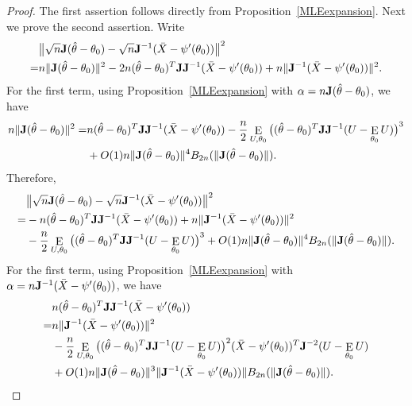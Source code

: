 \documentclass[11pt, letterpaper]{article}
\DeclareMathOperator{\myE}{E}
\theoremstyle{plain}
\theoremstyle{definition}
\theoremstyle{remark}
\begin{document}
\begin{proof}
    The first assertion follows directly from Proposition~\ref{MLEexpansion}.
    Next we prove the second assertion.
    Write
    $$
    \begin{aligned}
        &\big\|\sqrt{n}\mathbf{J}(\hat{\theta}-\theta_0)-\sqrt{n}\mathbf{J}^{-1}(\bar{X}-\psi'(\theta_0))\big\|^2 \\
        =& n\|\mathbf{J}(\hat{\theta}-\theta_0)\|^2-2n(\hat{\theta}-\theta_0)^T \mathbf{J} \mathbf{J}^{-1}(\bar{X}-\psi'(\theta_0))+n\|\mathbf{J}^{-1}(\bar{X}-\psi'(\theta_0))\|^2.
    \end{aligned}
    $$
    For the first term, using Proposition~\ref{MLEexpansion} with $\alpha=n\mathbf{J}(\hat{\theta}-\theta_0)$, we have
    $$
    \begin{aligned}
        n\|\BJ(\hat{\theta}-\theta_0)\|^2=&n (\hat{\theta}-\theta_0)^T \BJ \BJ^{-1}(\bar{X}-\psi'(\theta_0))-\frac{n}{2}\myE_{U,\theta_0}\big((\hat{\theta}-\theta_0)^T \BJ \BJ^{-1}(U-\myE_{\theta_0}U)\big)^3\\
        &+O(1)n\|\BJ(\hat{\theta}-\theta_0)\|^4 B_{2n}(\|\BJ (\hat{\theta}-\theta_0)\|).
    \end{aligned}
    $$
    Therefore,
    $$
    \begin{aligned}
        &\big\|\sqrt{n}\BJ(\hat{\theta}-\theta_0)-\sqrt{n}\BJ^{-1}(\bar{X}-\psi'(\theta_0))\big\|^2 \\
        =&-n(\hat{\theta}-\theta_0)^T \BJ \BJ^{-1}(\bar{X}-\psi'(\theta_0))+n\|\BJ^{-1}(\bar{X}-\psi'(\theta_0))\|^2\\
        &-\frac{n}{2}\myE_{U,\theta_0}\big((\hat{\theta}-\theta_0)^T \BJ \BJ^{-1}(U-\myE_{\theta_0}U)\big)^3
        +O(1)n\|\BJ(\hat{\theta}-\theta_0)\|^4 B_{2n}(\|\BJ (\hat{\theta}-\theta_0)\|).
    \end{aligned}
    $$
    For the first term, using Proposition~\ref{MLEexpansion} with $\alpha=n\mathbf{J}^{-1}(\bar{X}-\psi'(\theta_0))$, we have
    $$
    \begin{aligned}
        &n(\hat{\theta}-\theta_0)^T \BJ \BJ^{-1}(\bar{X}-\psi'(\theta_0))\\
        =&n\|\BJ^{-1}(\bar{X}-\psi'(\theta_0))\|^2\\
        &-\frac{n}{2}\myE_{U,\theta_0}\big((\hat{\theta}-\theta_0)^T \BJ \BJ^{-1}(U-\myE_{\theta_0}U)\big)^2 (\bar{X}-\psi'(\theta_0))^T \BJ^{-2}(U-\myE_{\theta_0}U)\\
        &+O(1) n \|\BJ (\hat{\theta}-\theta_0)\|^3\|\BJ^{-1}(\bar{X}-\psi'(\theta_0))\| B_{2n}(\|\BJ(\hat{\theta}-\theta_0)\|).
    \end{aligned}
$$
\end{proof}
\end{document}
